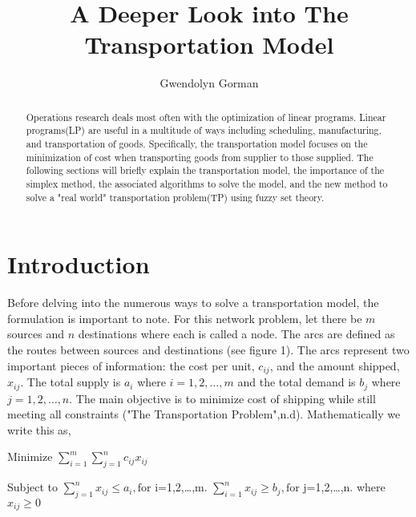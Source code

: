 \documentclass{article}
\title{A Deeper Look into The Transportation Model}
\author{Gwendolyn Gorman}
\begin{document}
\maketitle

\begin{abstract}
Operations research deals most often with the optimization of linear programs. Linear programs(LP) are useful in a multitude of ways including scheduling, manufacturing, and transportation of goods. Specifically, the transportation model focuses on the minimization of cost when transporting goods from supplier to those supplied. The following sections will briefly explain the transportation model, the importance of the simplex method, the associated algorithms to solve the model, and the new method to solve a "real world" transportation problem(TP) using fuzzy set theory. 
\end{abstract}

\section{Introduction}

Before delving into the numerous ways to solve a transportation model, the formulation is important to note. For this network problem, let there be $m$ sources and $n$ destinations where each is called a node. The arcs are defined as the routes between sources and destinations (see figure 1). The arcs represent two important pieces of information: the cost per unit, $ c_{ij} $, and the amount shipped, $ x_{ij}$. The total supply is $a_{i}$ where $i = 1,2,\dots,m$ and the total demand is $b_{j}$ where $j=1,2,\dots,n.$ The main objective is to minimize cost of shipping while still meeting all constraints ("The Transportation Problem",n.d). Mathematically we write this as,

\vspace{0.25 cm}
\hspace{2 cm}

Minimize 
$\sum\limits_{i=1}^m \sum\limits_{j=1}^n c_{ij} x_{ij}$  

Subject to
\newline
\vspace{0.25 cm}
\hspace{2 cm}
$\sum\limits_{j=1}^nx_{ij} \leq a_{i}, \text{for}$
\space i=1,2,\dots,m.
\newline
\vspace{0.25 cm}
\hspace{2 cm}
$\sum\limits_{i=1}^n x_{ij} \geq b_j, \text{for}$
\space j=1,2,\dots,n.
\hspace {2cm}
 where $x_{ij}\geq 0 $
\end{document}
